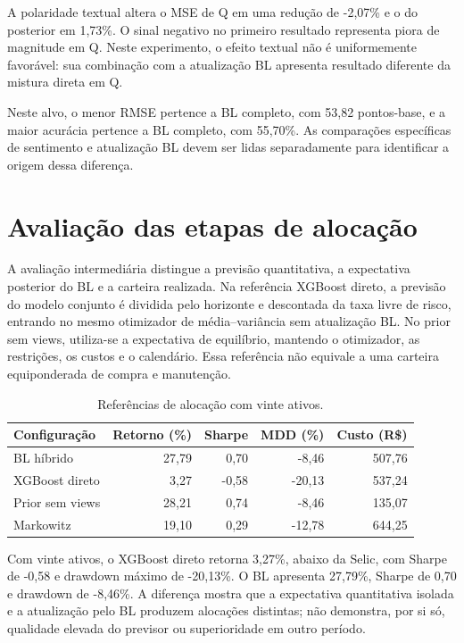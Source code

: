 A polaridade textual altera o MSE de Q em uma redução de -2,07\% e o do posterior em 1,73\%. O sinal negativo no primeiro resultado representa piora de magnitude em Q. Neste experimento, o efeito textual não é uniformemente favorável: sua combinação com a atualização BL apresenta resultado diferente da mistura direta em Q.

Neste alvo, o menor RMSE pertence a BL completo, com 53,82 pontos-base, e a maior acurácia pertence a BL completo, com 55,70\%. As comparações específicas de sentimento e atualização BL devem ser lidas separadamente para identificar a origem dessa diferença.

\section{Avaliação das etapas de alocação}
\label{sec:etapas_alocacao}
A avaliação intermediária distingue a previsão quantitativa, a expectativa posterior do BL e a carteira realizada. Na referência XGBoost direto, a previsão do modelo conjunto é dividida pelo horizonte e descontada da taxa livre de risco, entrando no mesmo otimizador de média--variância sem atualização BL. No prior sem views, utiliza-se a expectativa de equilíbrio, mantendo o otimizador, as restrições, os custos e o calendário. Essa referência não equivale a uma carteira equiponderada de compra e manutenção.

\begin{table}[H]
\centering
\caption{Referências de alocação com vinte ativos.}
\label{tab:etapas_alocacao}
{\footnotesize
\begin{tabular}{@{}lrrrr@{}}
\hline
Configuração & Retorno (\%) & Sharpe & MDD (\%) & Custo (R\$) \\ \hline
BL híbrido & 27,79 & 0,70 & -8,46 & 507,76 \\
XGBoost direto & 3,27 & -0,58 & -20,13 & 537,24 \\
Prior sem views & 28,21 & 0,74 & -8,46 & 135,07 \\
Markowitz & 19,10 & 0,29 & -12,78 & 644,25 \\
\hline
\end{tabular}}
\par{}
\end{table}
Com vinte ativos, o XGBoost direto retorna 3,27\%, abaixo da Selic, com Sharpe de -0,58 e drawdown máximo de -20,13\%. O BL apresenta 27,79\%, Sharpe de 0,70 e drawdown de -8,46\%. A diferença mostra que a expectativa quantitativa isolada e a atualização pelo BL produzem alocações distintas; não demonstra, por si só, qualidade elevada do previsor ou superioridade em outro período.

